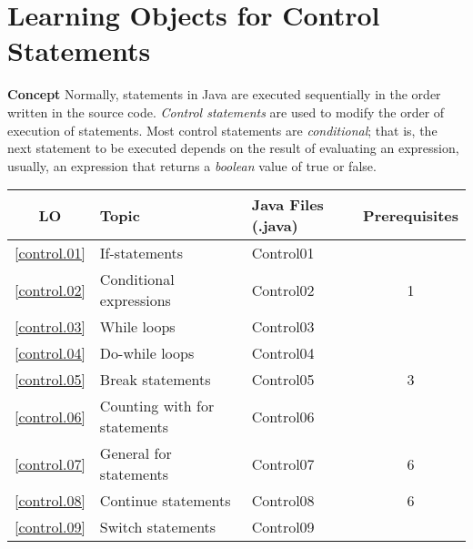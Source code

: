 \section{Learning Objects for Control Statements}\label{s.control}

\textbf{Concept} Normally, statements in Java are executed sequentially
in the order written in  the source code. \emph{Control statements} are used
to modify the order of execution of statements. Most control statements are \emph{conditional};
that is, the next statement to be executed depends on the result of evaluating
an expression, usually, an expression that returns a \emph{boolean} value of true or false.

\begin{center}
\begin{tabular}{|c|l|l|c|}
\hline
LO & Topic  & Java Files (.java) & Prerequisites \\\hline
\ref{control.01} &  If-statements                     & Control01 &\\\hline
\ref{control.02} &  Conditional expressions           & Control02 & 1\\\hline
\ref{control.03} &  While loops                       & Control03 & \\\hline
\ref{control.04} &  Do-while loops                     & Control04 &  \\\hline
\ref{control.05} &  Break statements                  & Control05 & 3\\\hline
\ref{control.06} &  Counting with for statements      & Control06 & \\\hline
\ref{control.07} &  General for statements            & Control07 & 6\\\hline
\ref{control.08} &  Continue statements               & Control08 & 6\\\hline
\ref{control.09} &  Switch statements                  & Control09 & \\\hline
\end{tabular}
\end{center}












